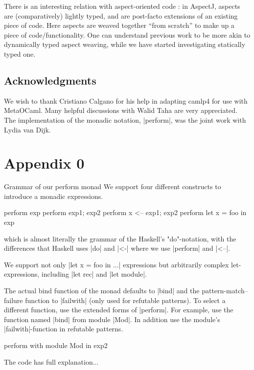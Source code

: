 \documentclass[draft]{elsart}
\begin{document}
There is an interesting relation with aspect-oriented code
\cite{kiczales97aspectoriented}: in AspectJ, 
aspects are (comparatively) lightly typed, and are post-facto extensions of an
existing piece of code.  Here aspects are weaved together ``from scratch'' to
make up a piece of code/functionality.  One can understand previous work to be
more akin to dynamically typed aspect weaving, while we have started
investigating statically typed one.

\subsection*{Acknowledgments}
We wish to thank Cristiano Calgano for his help in adapting camlp4 for
use with MetaOCaml. Many helpful discussions with Walid Taha are very
appreciated. The implementation of the monadic notation, |perform|,
was the joint work with Lydia van Dijk.



\section{Appendix 0}
\label{app:perform}
Grammar of our perform monad
We support four different constructs to introduce a monadic
expressions.

\begin{code}
  perform exp
  perform exp1; exp2
  perform x <-- exp1; exp2
  perform let x = foo in exp
\end{code}

which is almost literally the grammar of the Haskell's "do"-notation,
with the differences that Haskell uses |do| and |<-| where we use
|perform| and |<--|.

We support not only |let x = foo in ...|  expressions but arbitrarily
complex let-expressions, including |let rec| and |let module|.

The actual bind function of the monad defaults to |bind| and the
pattern-match--failure function to |failwith| (only used for refutable
patterns).  To select a different function, use the
extended forms of |perform|. For example, use the function named 
|bind| from module |Mod|.  In
addition use the module's |failwith|-function in refutable patterns.
\begin{code}
        perform with module Mod in exp2
\end{code}
The code has full explanation...
\end{document}
